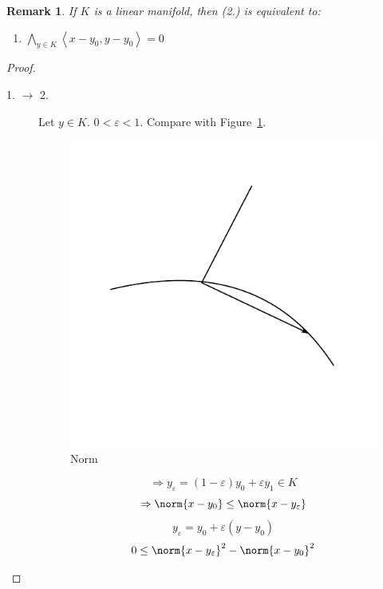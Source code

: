 \documentclass[a4paper,landscape,twocolumn]{article}
\newcommand\functional[1]{\left\langle{#1}\right\rangle}
\newtheorem{rem}{Remark}
\DeclarePairedDelimiter\norm\lVert\rVert
\begin{document}
\begin{rem}
  If $K$ is a linear manifold, then (2.) is equivalent to:
  \begin{enumerate}
    \item[2'.] $\bigwedge_{y \in K} \functional{x - y_0, y - y_0} = 0$
  \end{enumerate}
\end{rem}

\begin{proof}
  \begin{description}
    \item[1. $\rightarrow$ 2.]
      Let $y \in K$. $0 < \varepsilon < 1$. Compare with Figure~\ref{img:norm}.
      \begin{figure}[!h]
        \begin{center}
          \includegraphics{img/norm.pdf}
          \caption{Norm}
          \label{img:norm}
        \end{center}
      \end{figure}
      \[ \Rightarrow y_\varepsilon = (1 - \varepsilon) y_0 + \varepsilon y_1 \in K \]
      \[ \Rightarrow \norm{x - y_0} \leq \norm{x - y_\varepsilon} \]
      \[ y_\varepsilon = y_0 + \varepsilon (y - y_0) \]
      \begin{align*}
        0 &\leq \norm{x - y_\varepsilon}^2 - \norm{x - y_0}^2 \\

\end{align*}
\end{description}
\end{proof}
\end{document}
